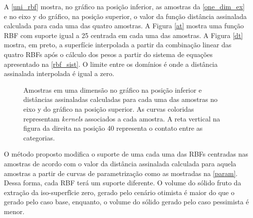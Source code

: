 A \autoref{uni_rbf} mostra, no gráfico na posição inferior, as amostras da \autoref{one_dim_ex} e no eixo y do gráfico, na posição superior, o valor da função distância assinalada calculada para cada uma das quatro amostras. A Figura \autoref{at} mostra uma função RBF com suporte igual a 25 centrada em cada uma das amostras. A Figura \autoref{dt} mostra, em preto, a superfície interpolada a partir da combinação linear das quatro RBFs após o cálculo dos pesos a partir do sistema de equações apresentado na \autoref{rbf_sist}. O limite entre os domínios é onde a distância assinalada interpolada é igual a zero.

\begin{figure}[H] 
    \centering
    \caption{Amostras em uma dimensão no gráfico na posição inferior e distâncias assinaladas calculadas para cada uma das amostras no eixo y do gráfico na posição superior. As curvas coloridas representam \textit{kernels} associados a cada amostra. A reta vertical na figura da direita na posição 40 representa o contato entre as categorias.} \label{uni_rbf}
     \hspace{1em}
\end{figure}

O método proposto modifica o suporte de uma cada uma das RBFs centradas nas amostras de acordo com o valor da distância assinalada calculada para aquela amostras a partir de curvas de parametrização como as mostradas na \autoref{param}. Dessa forma, cada RBF terá um suporte diferente. O volume do sólido fruto da extração da iso-superfĩcie zero, gerado pelo cenário otimista é maior do que o gerado pelo caso base, enquanto, o volume do sólido gerado pelo caso pessimista é menor.

